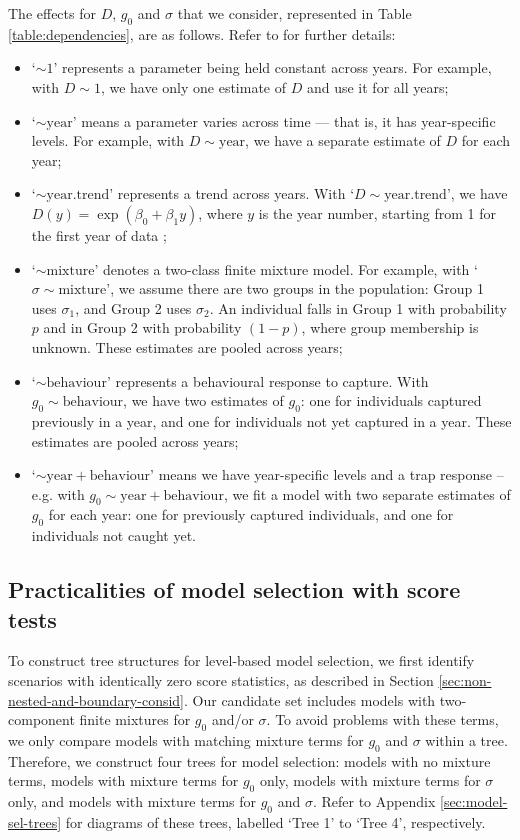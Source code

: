 \documentclass{article}
\begin{document}
The effects for $D$, $g_0$ and $\sigma$ that we consider, represented in Table
\ref{table:dependencies}, are as follows. Refer to \textcite{secr-book}
for further details:
\begin{itemize}[label={}]
\item `$\sim 1$' represents a parameter being held constant across
  years. For example, with $D \sim 1$, we have only one
  estimate of $D$ and use it for all years;
\item `$\sim \text{year}$' means a parameter varies across time ---
  that is, it has year-specific levels. For example, with $D \sim
  \text{year}$, we have a separate estimate 
  of $D$ for each year;
\item `$\sim \text{year.trend}$' represents a trend across
  years. With `$D \sim \text{year.trend}$', we  have $D(y) =
  \exp(\beta_0 + \beta_1 y)$, 
  where $y$ is the year number, starting from 1 for the first year of
  data \parencite{borchersEfford2008};  
\item `$\sim \text{mixture}$' denotes a
  two-class finite mixture model. For example, with `$\sigma \sim \text{mixture}$', we assume
  there are two groups in the population: Group 1 uses $\sigma_1$,
  and Group 2 uses $\sigma_2$. An 
  individual falls in Group 1 with probability $p$ and in Group 2
  with probability $(1-p)$, where group membership is unknown. These
  estimates are pooled across years;  
\item `$\sim \text{behaviour}$' represents a behavioural response to capture. With $g_0 \sim
  \text{behaviour}$, we have two estimates of $g_0$: one for individuals
  captured previously in a year, and one for individuals
  not yet captured in a year. These estimates are pooled
  across years;
\item `$\sim \text{year} + \text{behaviour}$' means we have
  year-specific levels and a trap response -- e.g. with $g_0 \sim \text{year} +
  \text{behaviour}$, we fit a model with two separate estimates of $g_0$ for
  each year: one for previously captured individuals, and one for
  individuals not caught yet. 
\end{itemize}

\subsection{Practicalities of model selection with score tests}
\label{sec:implementing-for-ex}

To construct tree structures for level-based model selection, we first
identify scenarios with identically zero score statistics, as described in Section
\ref{sec:non-nested-and-boundary-consid}. Our candidate set includes models with
two-component finite mixtures for $g_0$ and/or $\sigma$. To avoid
problems with these terms, we only compare models with matching mixture
terms for $g_0$ and $\sigma$ within a tree. Therefore, we construct four
trees for model selection: models with no mixture terms, models with
mixture terms for $g_0$ only, models with mixture terms for
$\sigma$ only, and models with mixture terms for $g_0$ and
$\sigma$. Refer to Appendix \ref{sec:model-sel-trees}
  for diagrams of these trees, labelled `Tree 1'
to `Tree 4', respectively.
\end{document}
